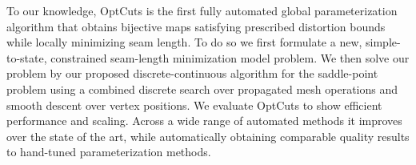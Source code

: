 To our knowledge, OptCuts is the first fully automated global parameterization algorithm that obtains bijective maps satisfying prescribed distortion bounds while locally minimizing seam length. To do so we first formulate a new, simple-to-state, constrained seam-length minimization model problem. We then solve our problem by our proposed discrete-continuous algorithm for the saddle-point problem using a combined discrete search over propagated mesh operations and smooth descent over vertex positions. We evaluate OptCuts to show efficient performance and scaling. Across a wide range of automated methods it improves over the state of the art, while automatically obtaining comparable quality results to hand-tuned parameterization methods. 

